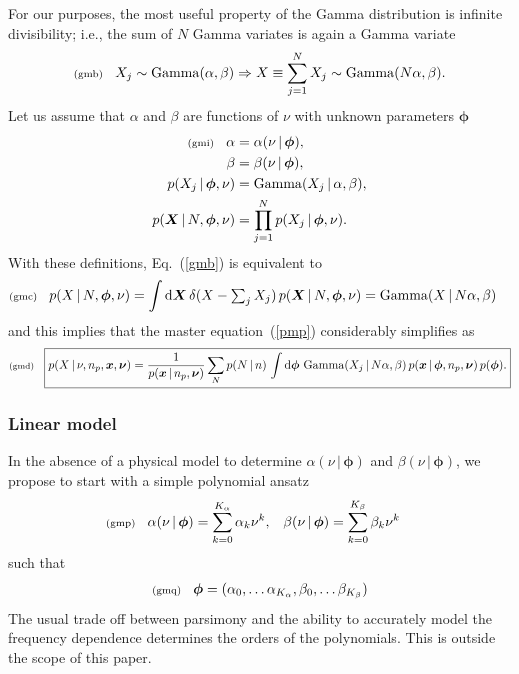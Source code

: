 \documentclass[11pt]{article}
\newcommand{\lleq}[1]{\label{#1} }
\renewcommand{\lleq}[1]{\label{#1} {\scriptstyle {\rm (#1)}} \hspace*{2ex} }
\newcommand{\cond}{\,|\,}
\newcommand{\bmx}{{{\bm{x}}}}
\newcommand{\bmX}{{\bm{X}}}
\newcommand{\bmphi}{{\bm{\phi}}}
\newcommand{\bmnu}{{\bm{\nu}}}
\newcommand{\refeq}[1]{Eq.~(\ref{#1})}
\DeclareMathOperator{\GammaDist}{Gamma}
\newcommand{\Kalpha}{{K_\alpha}}
\newcommand{\Kbeta}{{K_\beta}}
\newcommand{\npack}{n_p}
\newcommand{\rmdx}[1]{\mbox{d} #1 \,} %
\begin{document}
For our purposes, the most useful property of the Gamma
distribution is infinite divisibility; i.e., the sum of $N$ Gamma
variates is again a Gamma variate
\begin{align}
  \lleq{gmb}
    X_j \sim \GammaDist(\alpha, \beta) \Rightarrow X \equiv \sum_{j=1}^N X_j \sim \GammaDist(N \alpha, \beta).
\end{align}
Let us assume that $\alpha$ and $\beta$ are functions of $\nu$ with unknown parameters $\bmphi$
\begin{align}
  \lleq{gmi}
  \alpha &= \alpha(\nu \cond \bmphi),\\
  \beta &= \beta(\nu \cond \bmphi),\\
  p(X_j \cond \bmphi, \nu) &=
  \GammaDist(X_j \cond \alpha, \beta),\\
  p(\bmX \cond N, \bmphi, \nu) &= \prod_{j=1}^N p(X_j \cond \bmphi, \nu).
\end{align}
With these definitions, \refeq{gmb} is equivalent to
\begin{align}
  \lleq{gmc}
 p(X \cond N, \bmphi, \nu) &= \int \rmdx{\bmX} \delta(X - \textstyle\sum_j X_j)
  \,p(\bmX\cond N,\bmphi, \nu) = \GammaDist(X \cond N \alpha, \beta)
\end{align}
and this implies that the master equation~(\ref{pmp}) considerably simplifies as
\begin{align}
  \lleq{gmd}
    \boxed{
    p(X\cond \nu, \npack,\bmx,\bmnu)
  = \frac{1}{p(\bmx\cond \npack, \bmnu)}
  \sum_N p(N\cond n)\, \int \rmdx{\bmphi} \GammaDist(X_j \cond N \alpha, \beta) %
  \, p(\bmx\cond \bmphi, \npack, \bmnu)
  \, p(\bmphi).
  }
\end{align}

\subsubsection*{Linear model}

In the absence of a physical model to determine $\alpha(\nu \cond
\bmphi)$ and $\beta(\nu \cond \bmphi)$, we propose to start with a simple polynomial ansatz
\begin{align}
  \lleq{gmp}
  \alpha(\nu \cond \bmphi) &= \sum_{k=0}^\Kalpha \alpha_k \nu^k,
  &\beta(\nu \cond \bmphi) &= \sum_{k=0}^\Kbeta \beta_k \nu^k
\end{align}
such that
\begin{align}
  \lleq{gmq}
  \bmphi = (\alpha_0, \dots \alpha_\Kalpha , \beta_0, \dots \beta_\Kbeta)
\end{align}
The usual trade off between parsimony and the ability to accurately
model the frequency dependence determines the orders of the
polynomials. This is outside the scope of this paper.
\end{document}

